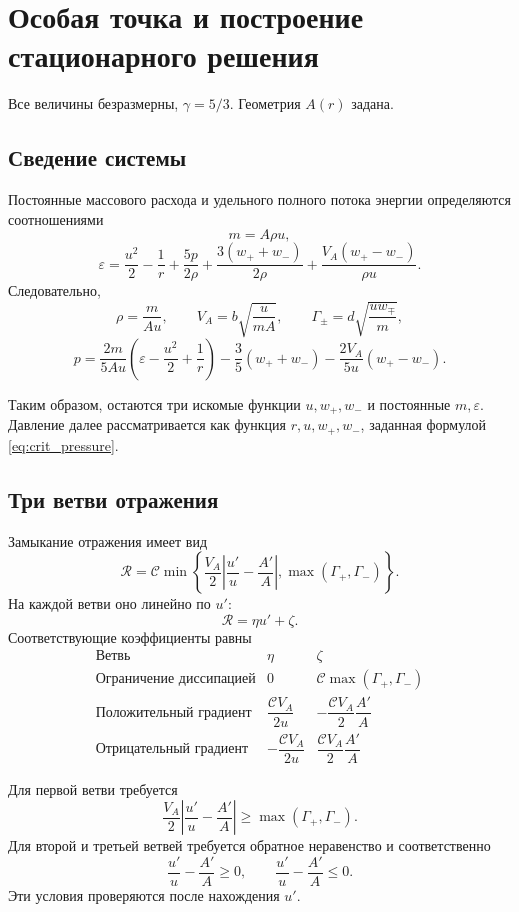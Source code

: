 \documentclass[12pt,a4paper]{article}
\begin{document}
\section{Особая точка и построение стационарного решения}

Все величины безразмерны, $\gamma=5/3$.
Геометрия $A(r)$ задана.

\subsection{Сведение системы}

Постоянные массового расхода и удельного полного
потока энергии определяются соотношениями
\[
m=A\rho u,
\]
\[
\varepsilon
=\frac{u^2}{2}-\frac1r+\frac{5p}{2\rho}
+\frac{3(w_++w_-)}{2\rho}
+\frac{V_A(w_+-w_-)}{\rho u}.
\]
Следовательно,
\[
\rho=\frac{m}{Au},\qquad
V_A=b\sqrt{\frac{u}{mA}},\qquad
\Gamma_\pm=d\sqrt{\frac{uw_\mp}{m}},
\]
\begin{equation}
p=\frac{2m}{5Au}
\left(\varepsilon-\frac{u^2}{2}+\frac1r\right)
-\frac35(w_++w_-)
-\frac{2V_A}{5u}(w_+-w_-).
\label{eq:crit_pressure}
\end{equation}

Таким образом, остаются три искомые функции
$u,w_+,w_-$ и постоянные $m,\varepsilon$.
Давление далее рассматривается как функция
$r,u,w_+,w_-$, заданная формулой
\eqref{eq:crit_pressure}.

\subsection{Три ветви отражения}

Замыкание отражения имеет вид
\[
\mathcal R
=\mathcal C\min\left\{
\frac{V_A}{2}\left|\frac{u'}u-\frac{A'}A\right|,
\max(\Gamma_+,\Gamma_-)
\right\}.
\]
На каждой ветви оно линейно по $u'$:
\[
\mathcal R=\eta u'+\zeta.
\]
Соответствующие коэффициенты равны
\[
\begin{array}{c|c|c}
\text{Ветвь} & \eta & \zeta\\ \hline
\text{Ограничение диссипацией}
&0&\mathcal C\max(\Gamma_+,\Gamma_-)\\[3pt]
\text{Положительный градиент}
&\dfrac{\mathcal C V_A}{2u}
&-\dfrac{\mathcal C V_A}{2}\dfrac{A'}A\\[7pt]
\text{Отрицательный градиент}
&-\dfrac{\mathcal C V_A}{2u}
&\dfrac{\mathcal C V_A}{2}\dfrac{A'}A
\end{array}
\]

Для первой ветви требуется
\[
\frac{V_A}{2}\left|\frac{u'}u-\frac{A'}A\right|
\geq\max(\Gamma_+,\Gamma_-).
\]
Для второй и третьей ветвей требуется обратное
неравенство и соответственно
\[
\frac{u'}u-\frac{A'}A\geq0,
\qquad
\frac{u'}u-\frac{A'}A\leq0.
\]
Эти условия проверяются после нахождения $u'$.
\end{document}
